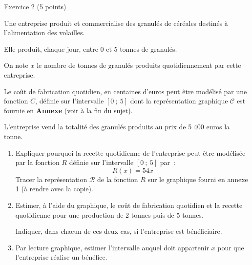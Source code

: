 
%
\begin{h2}Exercice 2 (5 points)\end{h2}
\par
\medskip
\par
Une entreprise produit et commercialise des granulés de céréales destinés à l'alimentation des volailles.
\par
Elle produit, chaque jour, entre 0 et 5 tonnes de granulés.
\par
On note $x$ le nombre de tonnes de granulés produits quotidiennement par cette entreprise.
\par
Le coût de fabrication quotidien, en centaines d'euros peut être modélisé par une fonction $C$, définie sur l'intervalle $[0~;~5]$  dont la représentation graphique $\mathscr{C}$ est fournie en \textbf{Annexe} (voir à la fin du sujet).
\par
L'entreprise vend la totalité des granulés produits au prix de 5 400 euros la tonne.
\par
%
%
\par
\begin{enumerate}
     \item Expliquer pourquoi la recette quotidienne de l'entreprise peut être modélisée par la fonction $R$ définie sur l'intervalle $[0~;~5]$ par~:
     \[ R(x)= 54x \]
     Tracer la représentation $\mathscr{R}$ de la fonction $R$ sur le graphique fourni en annexe 1 (à rendre avec la copie).
     \par
     \medskip
     \par
     \item Estimer, à l'aide du graphique, le coût de fabrication quotidien et la recette quotidienne pour une production de 2 tonnes puis de 5 tonnes.
     \par
     Indiquer, dans chacun de ces deux cas, si l'entreprise est bénéficiaire.
     \par
     \medskip
     \par
     \item Par lecture graphique, estimer l'intervalle auquel doit appartenir $x$ pour que l'entreprise réalise un bénéfice.
\end{enumerate}
